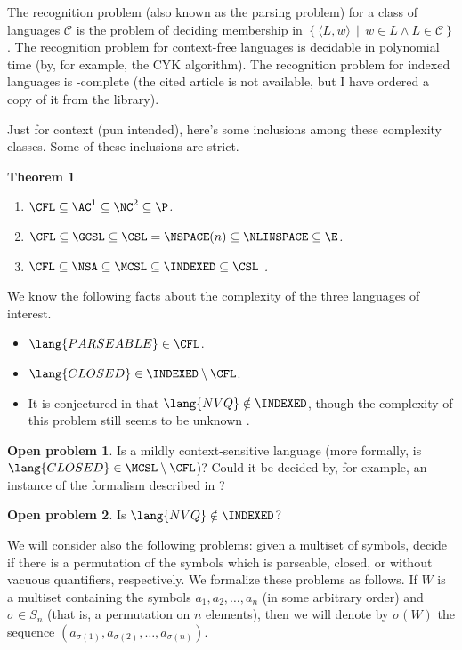 \documentclass[draft]{article}
\newtheorem{theorem}{Theorem}
\theoremstyle{remark} \newtheorem{technicality}{Technical note}
\theoremstyle{definition} \newtheorem{definition}{Definition}
\theoremstyle{definition} \newtheorem{openproblem}{Open problem}
\newcommand{\pair}[2]{\langle#1,#2\rangle} %
\newcommand{\lb}{\left\{} %
\newcommand{\rb}{\right\}} %
\newcommand{\st}{\,\middle|\,} %
\begin{document}
The recognition problem (also known as the parsing problem) for a class of languages $\mathcal{C}$ is the problem of deciding membership in $\lb\pair{L}{w}\st w\in L \land L\in\mathcal{C} \rb$.
The recognition problem for context-free languages is decidable in polynomial time (by, for example, the CYK algorithm).
The recognition problem for indexed languages is \EXP-complete \cite{tk86} (the cited article is not available, but I have ordered a copy of it from the library).

Just for context (pun intended), here's some inclusions among these complexity classes.
Some of these inclusions are strict.
\begin{theorem}\mbox{}
  \begin{enumerate}
  \item $\CFL\subseteq\AC^1\subseteq\NC^2\subseteq\P$.
  \item $\CFL\subseteq\GCSL\subseteq\CSL=\NSPACE(n)\subseteq\NLINSPACE\subseteq\E$.
  \item $\CFL\subseteq\NSA\subseteq\MCSL\subseteq\INDEXED\subseteq\CSL$ \cite{hu79}.
  \end{enumerate}
\end{theorem}

We know the following facts about the complexity of the three languages of interest.
\begin{itemize}
\item $\lang{PARSEABLE}\in\CFL$.
\item $\lang{CLOSED}\in\INDEXED\setminus\CFL$. \cite{mp84}
\item It is conjectured in \cite{mp84} that $\lang{NVQ}\notin\INDEXED$, though the complexity of this problem still seems to be unknown \cite{potts}.
\end{itemize}

\begin{openproblem}
  Is  a mildly context-sensitive language (more formally, is $\lang{CLOSED}\in\MCSL\setminus\CFL$)? Could it be decided by, for example, an instance of the formalism described in \cite{kallmeyer}?
\end{openproblem}

\begin{openproblem}
  Is $\lang{NVQ}\notin\INDEXED$?
\end{openproblem}

We will consider also the following problems: given a multiset of symbols, decide if there is a permutation of the symbols which is parseable, closed, or without vacuous quantifiers, respectively.
We formalize these problems as follows.
If $W$ is a multiset containing the symbols $a_1, a_2, \ldots, a_n$ (in some arbitrary order) and $\sigma\in S_n$ (that is, a permutation on $n$ elements), then we will denote by $\sigma(W)$ the sequence $(a_{\sigma(1)}, a_{\sigma(2)}, \ldots, a_{\sigma(n)})$.
\end{document}
